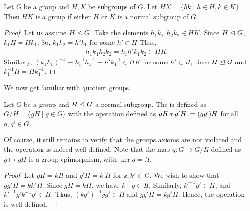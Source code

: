 Let $G$ be a group and $H,K$ be subgroups of $G$. Let $HK = \{hk \mid h \in H,k \in K\}$. Then $HK$ is a group if either $H$ or $K$ is a normal subgroup of $G$.
\begin{proof}
    Let us assume $H \trianglelefteq G$. Take the elements $h_{1}k_{1},h_{2}k_{2} \in HK$. Since $H \trianglelefteq G$, $k_{1}H = Hk_{1}$. So, $k_{1}h_{2} = h'k_{1}$ for some $h' \in H$ Thus,
    \begin{align}
        h_{1}k_{1}h_{2}k_{2} = h_{1}h'k_{1}k_{2} \in HK.
    \end{align}
    Similarly, $(h_{1}k_{1})^{-1} = k_{1}^{-1}h_{1}^{-1} = h'k_{1}^{-1} \in HK$ for some $h' \in H$, since $H \trianglelefteq G$ and $k_{1}^{-1}H =  Hk_{1}^{-1}$.
\end{proof}

We now get familiar with quotient groups.
\begin{definition}
    Let $G$ be a group and $H \trianglelefteq G$ a normal subgroup. The  is defined as $G/H = \{gH \mid g \in G\}$ with the operation defined as $gH \ast g'H \vcentcolon= (gg')H$ for all $g,g' \in G$.
\end{definition}
Of course, it still remains to verify that the groups axioms are not violated and the operation is indeed well-defined. Note that the map $q:G \to G/H$ defined as $g \mapsto gH$ is a group epimorphism, with $\ker q = H$.
\begin{proof}
    Let $gH = kH$ and $g'H = k'H$ for $k,k' \in G$. We wish to show that $gg'H = kk'H$. Since $gH = kH$, we have $k^{-1}g \in H$. Similarly, $k'^{-1}g' \in H$, and $k'^{-1}g'k^{-1}g' \in H$. Thus, $(kg')^{-1}gg' \in H$ and $gg'H = kg'H$. Hence, the operation is well-defined.
\end{proof}
